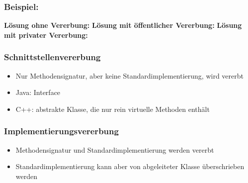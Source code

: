 {
\begin{frame}
	\frametitle{Beispiel:}
	{\tiny\UseRawInputEncoding{}}
	\pause
	{\bfseries Lösung ohne Vererbung:}
	{\tiny\UseRawInputEncoding{}}
	\pause
	{\bfseries Lösung mit öffentlicher Vererbung:}
	{\tiny\UseRawInputEncoding{}}
	\pause
	{\tiny\UseRawInputEncoding{}}
	\pause
	{\bfseries Lösung mit privater Vererbung:}
	{\tiny\UseRawInputEncoding{}}
\end{frame}
}


{
\begin{frame}
	\frametitle{Schnittstellenvererbung}
	\begin{itemize}
		\item Nur Methodensignatur, aber keine Standardimplementierung, wird vererbt
		\item Java: Interface
		\item C++: abstrakte Klasse, die nur rein virtuelle Methoden enthält
	\end{itemize}
\end{frame}
}

{
\begin{frame}
	\frametitle{Implementierungsvererbung}
	\begin{itemize}
		\item Methodensignatur und Standardimplementierung werden vererbt
		\item Standardimplementierung kann aber von abgeleiteter Klasse überschrieben werden
	\end{itemize}
\end{frame}
}


